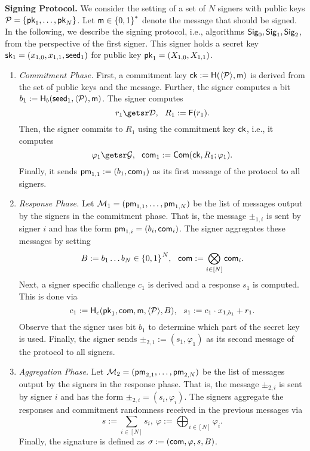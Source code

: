 \documentclass[version=final]{iacrcc}
\theoremstyle{mytheorem}				\newtheorem{theorem}{Theorem}
\theoremstyle{myplain}
\theoremstyle{mydefinition}
\theoremstyle{myremark}
\begin{document}
\smallskip\noindent\textbf{Signing Protocol.} We consider the setting of a set of $N$ signers with public keys ${\mathcal{P}} = \{{\mathsf{pk}}_1,\dots,{\mathsf{pk}}_N\}$.
Let $\mathsf{m} \in {\ensuremath{{\{0,1\}}^{*}}}$ denote the message that should be signed. 
In the following, we describe the signing protocol, i.e., algorithms ${\mathsf{Sig}}_0,\allowbreak{\ensuremath{\mathsf{Sig}}}_1,\allowbreak{\ensuremath{\mathsf{Sig}}}_2$, from the perspective of the first signer.
This signer holds a secret key ${\mathsf{sk}}_1 = (x_{1,0},x_{1,1},\mathsf{seed}_1)$ for public key ${\mathsf{pk}}_1 = (X_{1,0},X_{1,1})$.
\begin{enumerate}
	\item \textit{Commitment Phase.} First, a commitment key ${\mathsf{ck}} := \mathsf{H}({\langle{{\ensuremath{\mathcal{P}}}}\rangle},\mathsf{m})$ is derived from the set of public keys and the message.
	Further, the signer computes a bit $b_1 := \mathsf{H}_b(\mathsf{seed}_1,{\langle{{\ensuremath{\mathcal{P}}}}\rangle},\mathsf{m})$.
	The signer computes 
	\[ r_{1} \randfrom \DDD,~~R_{1} := \LFunction(r_{1}).\]
	Then, the signer commits to $R_1$ using the commitment key ${\mathsf{ck}}$, i.e., it computes 
	\[ \varphi_{1} \randfrom \Rand,~~\com_{1} := \Com(\ck,R_{1};\varphi_{1}).\]
	Finally, it sends \(\mathsf{pm}_{1,1} := (b_1,\mathsf{com}_{1})\) as its first message of the protocol to all signers.

	\item \textit{Response Phase.} Let ${\mathcal{M}}_1 = (\mathsf{pm}_{1,1},\dots,\allowbreak\mathsf{pm}_{1,N})$ be the list of messages output by the signers in the commitment phase. 
	That is, the message $\pm_{1,i}$ is sent by signer $i$ and has the form $\mathsf{pm}_{1,i} = (b_i,\mathsf{com}_{i})$.
	The signer aggregates these messages by setting \[
	B := b_1\dots b_N \in {\ensuremath{{\{0,1\}}^{\relax}}}^N,~~\mathsf{com} := \bigotimes_{i\in[N]} \mathsf{com}_{i}.
	\] 
	Next, a signer specific challenge $c_1$ is derived and a response $s_1$ is computed.
	This is done via \[
		c_{1} := \mathsf{H}_c({\mathsf{pk}}_1,\mathsf{com},\mathsf{m},{\langle{{\ensuremath{\mathcal{P}}}}\rangle},B),~~s_{1} := c_{1}\cdot x_{1,b_1} + r_{1}.
	\]
	Observe that the signer uses bit $b_1$ to determine which part of the secret key is used.
	Finally, the signer sends $\pm_{2,1} := (s_{1},\varphi_{1})$ as its second message of the protocol to all signers.

	\item \textit{Aggregation Phase.} Let ${\mathcal{M}}_2 = (\mathsf{pm}_{2,1},\dots,\allowbreak\mathsf{pm}_{2,N})$ be the list of messages output by the signers in the response phase. 
	That is, the message $\pm_{2,i}$ is sent by signer $i$ and has the form $\pm_{2,i} = (s_{i},\varphi_{i})$.
	The signers aggregate the responses and commitment randomness received in the previous messages via
	\[ s := \sum_{i\in[N]}s_{i},~\varphi := \bigoplus_{i\in[N]}\varphi_{i}.\]
	Finally, the signature is defined as $\sigma:=(\mathsf{com},\varphi,s,B)$.
\end{enumerate}
\end{document}
